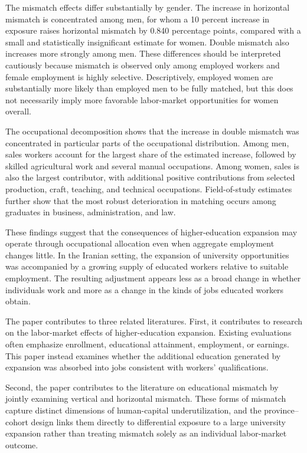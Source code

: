 The mismatch effects differ substantially by gender. The increase in horizontal mismatch is concentrated among men, for whom a 10 percent increase in exposure raises horizontal mismatch by 0.840 percentage points, compared with a small and statistically insignificant estimate for women. Double mismatch also increases more strongly among men. These differences should be interpreted cautiously because mismatch is observed only among employed workers and female employment is highly selective. Descriptively, employed women are substantially more likely than employed men to be fully matched, but this does not necessarily imply more favorable labor-market opportunities for women overall.

The occupational decomposition shows that the increase in double mismatch was concentrated in particular parts of the occupational distribution. Among men, sales workers account for the largest share of the estimated increase, followed by skilled agricultural work and several manual occupations. Among women, sales is also the largest contributor, with additional positive contributions from selected production, craft, teaching, and technical occupations. Field-of-study estimates further show that the most robust deterioration in matching occurs among graduates in business, administration, and law.

These findings suggest that the consequences of higher-education expansion may operate through occupational allocation even when aggregate employment changes little. In the Iranian setting, the expansion of university opportunities was accompanied by a growing supply of educated workers relative to suitable employment. The resulting adjustment appears less as a broad change in whether individuals work and more as a change in the kinds of jobs educated workers obtain.

The paper contributes to three related literatures. First, it contributes to research on the labor-market effects of higher-education expansion. Existing evaluations often emphasize enrollment, educational attainment, employment, or earnings. This paper instead examines whether the additional education generated by expansion was absorbed into jobs consistent with workers' qualifications.

Second, the paper contributes to the literature on educational mismatch by jointly examining vertical and horizontal mismatch. These forms of mismatch capture distinct dimensions of human-capital underutilization, and the province--cohort design links them directly to differential exposure to a large university expansion rather than treating mismatch solely as an individual labor-market outcome.

